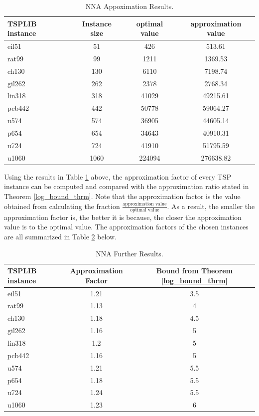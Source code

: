 \documentclass[12pt]{article}
\numberwithin{equation}{subsection}
\numberwithin{table}{subsection}
\numberwithin{algorithm}{subsection}
\numberwithin{figure}{subsection}
\begin{document}
\begin{table}[H]
    \caption{NNA Appoximation Results.}
    \label{tab:NNA_results}
    \begin{tabular}{l|c|c|c} %
      \textbf{TSPLIB instance} & \textbf{Instance size} & \textbf{optimal value} & \textbf{approximation value}\\
      \hline
    eil51 & 51 & 426 & 513.61\\
    rat99 & 99 & 1211 &  1369.53\\
    ch130 & 130 & 6110 & 7198.74 \\
    gil262 & 262 & 2378 & 2768.34\\
    lin318 & 318 & 41029 & 49215.61\\
    pcb442 & 442 & 50778 & 59064.27\\
    u574 & 574  & 36905 & 44605.14 \\ 
    p654 & 654 & 34643 & 40910.31\\
    u724 & 724 & 41910 & 51795.59\\
    u1060 & 1060 & 224094 & 276638.82\\
    \end{tabular}
\end{table}
Using the results in Table \ref{tab:NNA_results} above, the approximation factor of every TSP instance can be computed and compared with the approximation ratio stated in Theorem \ref{log_bound_thrm}. Note that the approximation factor is the value obtained from calculating the fraction $\frac{\text{approximation value}}{\text{optimal value}}$. As a result, the smaller the approximation factor is, the better it is because, the closer the approximation value is to the optimal value. The approximation factors of the chosen instances are all summarized in Table \ref{tab:NNA_further_results} below. 
\begin{table}[H]
    \caption{NNA Further Results.}
    \label{tab:NNA_further_results}
    \begin{tabular}{l|c|c} %
      \textbf{TSPLIB instance} & \textbf{Approximation Factor} & \textbf{Bound from Theorem \ref{log_bound_thrm}}\\
      \hline
    eil51 & 1.21 & 3.5\\
    rat99 & 1.13 & 4 \\
    ch130 & 1.18  & 4.5  \\
    gil262 &1.16 &  5  \\
    lin318 & 1.2 &  5  \\
    pcb442 & 1.16  & 5  \\
    u574 & 1.21   & 5.5  \\ 
    p654 & 1.18  & 5.5 \\
    u724 & 1.24 & 5.5 \\
    u1060 & 1.23  & 6  \\
    \end{tabular}
\end{table}
\end{document}
